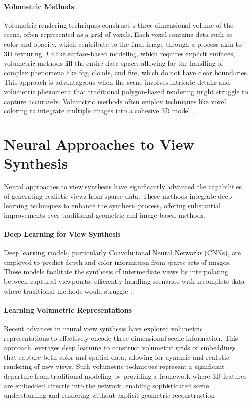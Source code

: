 \paragraph{Volumetric Methods}
Volumetric rendering techniques construct a three-dimensional volume of the scene, often represented as a grid of voxels. Each voxel contains data such as color and opacity, which contribute to the final image through a process akin to 3D texturing.
Unlike surface-based modeling, which requires explicit surfaces, volumetric methods fill the entire data space, allowing for the handling of complex phenomena like fog, clouds, and fire, which do not have clear boundaries.
This approach is advantageous when the scene involves intricate details and volumetric phenomena that traditional polygon-based rendering might struggle to capture accurately.
Volumetric methods often employ techniques like voxel coloring to integrate multiple images into a cohesive 3D model \cite{curless_volumetric_1996,seitz_photorealistic_1999}.


\section{Neural Approaches to View Synthesis}
Neural approaches to view synthesis have significantly advanced the capabilities of generating realistic views from sparse data.
These methods integrate deep learning techniques to enhance the synthesis process, offering substantial improvements over traditional geometric and image-based methods.

\paragraph{Deep Learning for View Synthesis}
Deep learning models, particularly Convolutional Neural Networks (CNNs), are employed to predict depth and color information from sparse sets of images.
These models facilitate the synthesis of intermediate views by interpolating between captured viewpoints, efficiently handling scenarios with incomplete data where traditional methods would struggle \cite{kalantari_learning-based_2016,maxim_tatarchenko_single-view_2015,peter_hedman_deep_2019}.

\paragraph{Learning Volumetric Representations}
Recent advances in neural view synthesis have explored volumetric representations to effectively encode three-dimensional scene information.
This approach leverages deep learning to construct volumetric grids or embeddings that capture both color and spatial data, allowing for dynamic and realistic rendering of new views.
Such volumetric techniques represent a significant departure from traditional modeling by providing a framework where 3D features are embedded directly into the network, enabling sophisticated scene understanding and rendering without explicit geometric reconstruction \cite{lombardi_neural_2019,sitzmann_deepvoxels_2019}.

